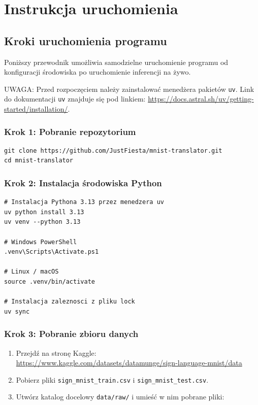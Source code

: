 \chapter{Instrukcja uruchomienia}
\label{cha:chapter005}

\section{Kroki uruchomienia programu}

Poniższy przewodnik umożliwia samodzielne uruchomienie programu od
konfiguracji środowiska po uruchomienie inferencji na żywo.

UWAGA: Przed rozpoczęciem należy zainstalować menedżera pakietów \texttt{uv}.
Link do dokumentacji \texttt{uv} znajduje się pod linkiem: \url{https://docs.astral.sh/uv/getting-started/installation/}.

\subsection*{Krok 1: Pobranie repozytorium}

\begin{lstlisting}[style=styleBash, numbers=none, caption={Klonowanie repozytorium}, label=lst:clone]
git clone https://github.com/JustFiesta/mnist-translator.git
cd mnist-translator
\end{lstlisting}

\subsection*{Krok 2: Instalacja środowiska Python}

\begin{lstlisting}[style=styleBash, numbers=none, caption={Konfiguracja środowiska wirtualnego}, label=lst:venv]
# Instalacja Pythona 3.13 przez menedzera uv
uv python install 3.13
uv venv --python 3.13

# Windows PowerShell
.venv\Scripts\Activate.ps1

# Linux / macOS
source .venv/bin/activate

# Instalacja zaleznosci z pliku lock
uv sync
\end{lstlisting}

\subsection*{Krok 3: Pobranie zbioru danych}

\begin{enumerate}
    \item Przejdź na stronę Kaggle:\\
          \url{https://www.kaggle.com/datasets/datamunge/sign-language-mnist/data}
    \item Pobierz pliki \texttt{sign\_mnist\_train.csv} i \texttt{sign\_mnist\_test.csv}.
    \item Utwórz katalog docelowy \texttt{data/raw/} i umieść w nim pobrane pliki:
\end{enumerate}

